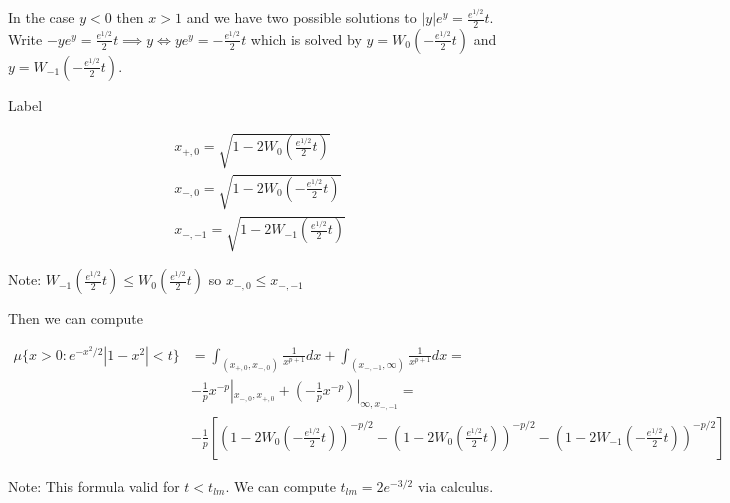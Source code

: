 \documentclass[10pt]{article}
\newcommand{\1}{\textbf{1}}
\theoremstyle{remark}
\theoremstyle{definition}
\theoremstyle{prop}
\theoremstyle{Corollary}
\begin{document}
In the case $y < 0$ then $x > 1$ and we have two possible solutions to $|y|e^y = \frac{e^{1/2}}{2}t$. Write $-y e^y = \frac{e^{1/2}}{2}t \implies y \iff y e^y = -\frac{e^{1/2}}{2}t$ which is solved by $y = W_0(-\frac{e^{1/2}}{2}t)$ and $y = W_{-1}(-\frac{e^{1/2}}{2}t)$. 

Label

\begin{align*}
	x_{+,0} = \sqrt{1 - 2W_0(\frac{e^{1/2}}{2}t)}\\
	x_{-,0} = \sqrt{1 - 2W_0(-\frac{e^{1/2}}{2}t)}\\
	x_{-,-1} = \sqrt{1-2W_{-1}(\frac{e^{1/2}}{2}t)}
\end{align*}

Note: $W_{-1}(\frac{e^{1/2}}{2}t) \leq W_{0}(\frac{e^{1/2}}{2}t)$ so $x_{-,0} \leq x_{-,-1}$

Then we can compute 

\begin{align*}
	\mu\{ x > 0: e^{-x^2/2}|1-x^2| < t\} &= \int_{(x_{+,0},x_{-,0})} \frac{1}{x^{p+1}} dx + \int_{(x_{-,-1},\infty)} \frac{1}{x^{p+1}}dx = \\
	& -\frac{1}{p}x^{-p}|_{x_{-,0},x_{+,0}} + (-\frac{1}{p}x^{-p})|_{\infty,x_{-,-1}} = \\
	& -\frac{1}{p}[(1 - 2W_0(-\frac{e^{1/2}}{2}t))^{-p/2} - (1 - 2W_0(\frac{e^{1/2}}{2}t))^{-p/2} - (1 - 2W_{-1}(-\frac{e^{1/2}}{2}t))^{-p/2}]
\end{align*}

Note: This formula valid for $t < t_{lm}$. We can compute $t_{lm} = 2e^{-3/2}$ via calculus.
\end{document}
